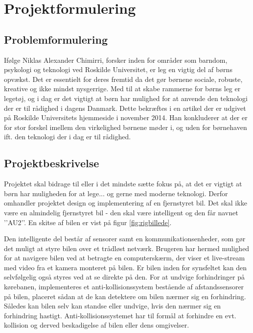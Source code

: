 \chapter{Projektformulering} \label{ch:projektformulering}
\section{Problemformulering} \label{sec:problemformulering}
Ifølge Niklas Alexander Chimirri, forsker inden for områder som barndom, psykologi og teknologi ved Roskilde Universitet, er leg en vigtig del af børns opvækst.   
Det er essentielt for deres fremtid da det gør børnene sociale, robuste, kreative og ikke mindst nysgerrige. Med til at skabe rammerne for børns leg er legetøj, og i dag er det vigtigt at børn har mulighed for at anvende den teknologi der er til rådighed i dagens Danmark. 
Dette bekræftes i en artikel der er udgivet på Roskilde Universitets hjemmeside i november 2014.
Han konkluderer at der er for stor forskel imellem den virkelighed børnene møder i, og uden for børnehaven ift. den teknologi der i dag er til rådighed. 



\section{Projektbeskrivelse} \label{sec:beskrivelse}


Projektet skal bidrage til eller i det mindste sætte fokus på, at det er vigtigt at børn har muligheden for at lege... og gerne med moderne teknologi. Derfor omhandler projektet design og implementering af en fjernstyret bil. Det skal ikke være en almindelig fjernstyret bil - den skal være intelligent og den får navnet ’’AU2’’. En skitse af bilen er vist på figur \ref{fig:rigbillede}.

Den intelligente del består af sensorer samt en kommunikationsenheder, som gør det muligt at styre bilen over et trådløst netværk. Brugeren har hermed mulighed for at navigere bilen ved at betragte en computerskærm, der viser et live-stream med video fra et kamera monteret på bilen. Er bilen inden for synsfeltet kan den selvfølgelig også styres ved at se direkte på den. For at undvige forhindringer på kørebanen, implementeres et anti-kollisionssystem bestående af afstandssensorer på bilen, placeret sådan at de kan detektere om bilen nærmer sig en forhindring. Således kan bilen selv kan standse eller undvige, hvis den nærmer sig en forhindring hastigt. Anti-kollisionssystemet har til formål at  forhindre en evt. kollision og derved beskadigelse af bilen eller dens omgivelser.

